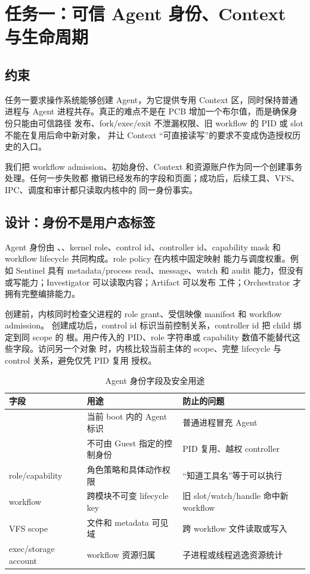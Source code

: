 \chapter{任务一：可信 Agent 身份、Context 与生命周期}
\label{chap:task1}

\section{约束}

任务一要求操作系统能够创建 Agent，为它提供专用 Context 区，同时保持普通进程与
Agent 进程共存。真正的难点不是在 PCB 增加一个布尔值，而是确保身份只能由可信路径
发布、fork/exec/exit 不泄漏权限、旧 workflow 的 PID 或 slot 不能在复用后命中新对象，
并让 Context “可直接读写”的要求不变成伪造授权历史的入口。

我们把 workflow admission、初始身份、Context 和资源账户作为同一个创建事务处理。任何一步失败都
撤销已经发布的字段和页面；成功后，后续工具、VFS、IPC、调度和审计都只读取内核中的
同一身份事实。

\section{设计：身份不是用户态标签}

Agent 身份由 、、kernel role、control id、controller
id、capability mask 和 workflow lifecycle 共同构成。role policy 在内核中固定映射
能力与调度权重。例如 Sentinel 具有 metadata/process read、message、watch 和 audit
能力，但没有  或写能力；Investigator 可以读取内容；Artifact 可以发布
工件；Orchestrator 才拥有完整编排能力。

创建前，内核同时检查父进程的 role grant、受信映像 manifest 和 workflow admission。
创建成功后，control id 标识当前控制关系，controller id 把 child 绑定到同 scope 的
根。用户传入的 PID、role 字符串或 capability 数值不能替代这些字段。访问另一个对象
时，内核比较当前主体的 scope、完整 lifecycle 与 control 关系，避免仅凭 PID 复用
授权。

\begin{table}[htbp]
\centering
\caption{Agent 身份字段及安全用途}
\label{tab:identity-fields}
\begin{tabularx}{\textwidth}{L{3.0cm}YY}
\toprule
\textbf{字段} & \textbf{用途} & \textbf{防止的问题} \\
\midrule
{} & 当前 boot 内的 Agent 标识 & 普通进程冒充 Agent \\
 & 不可由 Guest 指定的控制身份 & PID 复用、越权 controller \\
role/capability & 角色策略和具体动作权限 & “知道工具名”等于可以执行 \\
workflow  & 跨模块不可变 lifecycle key & 旧 slot/watch/handle 命中新 workflow \\
VFS scope & 文件和 metadata 可见域 & 跨 workflow 文件读取或写入 \\
exec/storage account & workflow 资源归属 & 子进程或线程逃逸资源统计 \\
\bottomrule
\end{tabularx}
\end{table}

